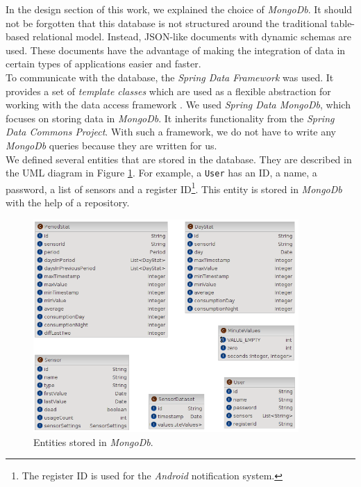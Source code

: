 \documentclass[a4paper, oneside, 11pt]{book}
\begin{document}
In the design section of this work, we explained the choice of \textit{MongoDb}. It should not be forgotten that this database is not structured around the traditional table-based relational model. Instead, JSON-like documents with dynamic schemas are used. These documents have the advantage of making the integration of data in certain types of applications easier and faster. \\

To communicate with the database, the \textit{Spring Data Framework} was used. It provides a set of \emph{template classes} which are used as a flexible abstraction for working with the data access framework \cite{springdata:online}. We used \textit{Spring Data MongoDb}, which focuses on storing data in \textit{MongoDb}. It inherits functionality from the \textit{Spring Data Commons Project}. With such a framework, we do not have to write any \textit{MongoDb} queries because they are written for us.\\

We defined several entities that are stored in the database. They are described in the UML diagram in Figure \ref{fig:entities}. For example, a \texttt{User} has an ID, a name, a password, a list of sensors and a register ID\footnote{The register ID is used for the \textit{Android} notification system.}. This entity is stored in \textit{MongoDb} with the help of a repository.

\begin{figure}[htbp]
	\centerline{\includegraphics[width=0.9\textwidth]{entities.png}}
	\caption{Entities stored in \textit{MongoDb}.}
	\label{fig:entities}
\end{figure}
\end{document}

